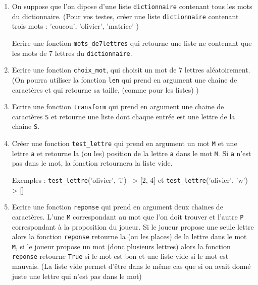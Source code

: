 



\begin{exercice}


\begin{enumerate}
\item On suppose que l'on dipose d'une liste \texttt{dictionnaire} contenant tous les mots du dictionnaire. (Pour vos testes, créer une liste  \texttt{dictionnaire} contenant trois mots : 'coucou', 'olivier', 'matrice' )

Ecrire une fonction \texttt{mots\_de7lettres} qui retourne une liste ne contenant que les mots de 7 lettres du \texttt{dictionnaire}.

\item Ecrire une fonction \texttt{choix\_mot}, qui choisit un mot de 7 lettres aléatoirement.
(On pourra utiliser la fonction \texttt{len} qui prend en argument une chaine de caractères et qui retourne sa taille, (comme pour les listes) ) 

\item Ecrire une fonction \texttt{transform} qui prend en argument une chaine de caractères \texttt{S} et retourne une liste dont chaque entrée est une lettre de la chaine \texttt{S}.

\item Créer une fonction \texttt{test\_lettre} qui prend en argument un mot \texttt{M} et une lettre \texttt{a} et retourne la (ou les) position de la lettre \texttt{a} dans le mot \texttt{M}. Si \texttt{a} n'est pas dans le mot, la fonction retournera la liste vide. 

Exemples : \texttt{test\_lettre}('olivier', 'i') --> [2, 4] et \texttt{test\_lettre}('olivier', 'w') --> []

\item Ecrire une fonction  \texttt{reponse} qui prend en argument deux chaines de caractères. L'une \texttt{M} correspondant au mot que l'on doit trouver et l'autre \texttt{P} correspondant à la proposition du joueur. Si le joueur propose une seule lettre alors  la fonction \texttt{reponse}  retourne la (ou les places) de la lettre dans le mot \texttt{M}, si le joueur propose un mot (donc plusieurs lettres) alors la fonction \texttt{reponse} retourne \texttt{True} si le mot est bon et une liste vide si le mot est mauvais. (La liste vide permet d'être dans le même cas que si on avait donné juste une lettre qui n'est pas dans le mot) 


\end{enumerate}
\end{exercice}

